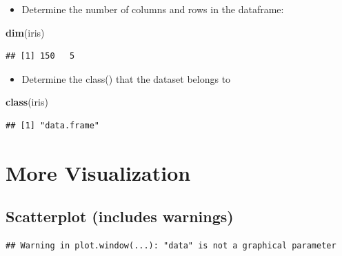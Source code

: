 \documentclass[
]{book}
\newenvironment{Shaded}{\begin{snugshade}}{\end{snugshade}}
\newcommand{\AttributeTok}[1]{\textcolor[rgb]{0.13,0.29,0.53}{#1}}
\newcommand{\DocumentationTok}[1]{\textcolor[rgb]{0.56,0.35,0.01}{\textbf{\textit{#1}}}}
\newcommand{\FunctionTok}[1]{\textcolor[rgb]{0.13,0.29,0.53}{\textbf{#1}}}
\newcommand{\NormalTok}[1]{#1}
\newcommand{\SpecialCharTok}[1]{\textcolor[rgb]{0.81,0.36,0.00}{\textbf{#1}}}
\providecommand{\tightlist}{%
  \setlength{\itemsep}{0pt}\setlength{\parskip}{0pt}}
\begin{document}
\begin{itemize}
\tightlist
\item
  Determine the number of columns and rows in the dataframe:
\end{itemize}

\begin{Shaded}
\begin{Highlighting}[]
\FunctionTok{dim}\NormalTok{(iris)}
\end{Highlighting}
\end{Shaded}

\begin{verbatim}
## [1] 150   5
\end{verbatim}

\begin{itemize}
\tightlist
\item
  Determine the class() that the dataset belongs to
\end{itemize}

\begin{Shaded}
\begin{Highlighting}[]
\FunctionTok{class}\NormalTok{(iris)}
\end{Highlighting}
\end{Shaded}

\begin{verbatim}
## [1] "data.frame"
\end{verbatim}

\section{More Visualization}\label{more-visualization}

\subsection{Scatterplot (includes warnings)}\label{scatterplot-includes-warnings}

\begin{Shaded}
\end{Shaded}

\begin{verbatim}
## Warning in plot.window(...): "data" is not a graphical parameter
\end{verbatim}
\end{document}
